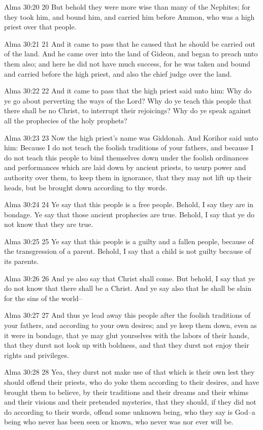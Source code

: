 Alma 30:20
 20 But behold they were more wise than many of the Nephites; for
they took him, and bound him, and carried him before Ammon, who
was a high priest over that people.

Alma 30:21
 21 And it came to pass that he caused that he should be carried
out of the land. And he came over into the land of Gideon, and
began to preach unto them also; and here he did not have much
success, for he was taken and bound and carried before the high
priest, and also the chief judge over the land.

Alma 30:22
 22 And it came to pass that the high priest said unto him: Why
do ye go about perverting the ways of the Lord? Why do ye teach
this people that there shall be no Christ, to interrupt their
rejoicings? Why do ye speak against all the prophecies of the
holy prophets?

Alma 30:23
 23 Now the high priest's name was Giddonah. And Korihor said
unto him: Because I do not teach the foolish traditions of your
fathers, and because I do not teach this people to bind
themselves down under the foolish ordinances and performances
which are laid down by ancient priests, to usurp power and
authority over them, to keep them in ignorance, that they may not
lift up their heads, but be brought down according to thy words.

Alma 30:24
 24 Ye say that this people is a free people. Behold, I say they
are in bondage. Ye say that those ancient prophecies are true.
Behold, I say that ye do not know that they are true.

Alma 30:25
 25 Ye say that this people is a guilty and a fallen people,
because of the transgression of a parent. Behold, I say that a
child is not guilty because of its parents.

Alma 30:26
 26 And ye also say that Christ shall come. But behold, I say
that ye do not know that there shall be a Christ. And ye say
also that he shall be slain for the sins of the world--

Alma 30:27
 27 And thus ye lead away this people after the foolish
traditions of your fathers, and according to your own desires;
and ye keep them down, even as it were in bondage, that ye may
glut yourselves with the labors of their hands, that they durst
not look up with boldness, and that they durst not enjoy their
rights and privileges.

Alma 30:28
 28 Yea, they durst not make use of that which is their own lest
they should offend their priests, who do yoke them according to
their desires, and have brought them to believe, by their
traditions and their dreams and their whims and their visions and
their pretended mysteries, that they should, if they did not do
according to their words, offend some unknown being, who they say
is God--a being who never has been seen or known, who never was
nor ever will be.

